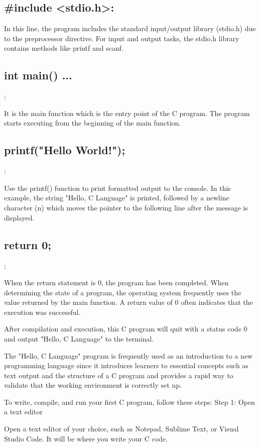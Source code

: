 \documentclass[11pt]{article}
\begin{document}
\subsection{\#include <stdio.h>:}

In this line, the program includes the standard input/output library (stdio.h) due to the preprocessor directive. For input and output tasks, the stdio.h library contains methods like printf and scanf.

\subsection{int main() { ... }}:

It is the main function which is the entry point of the C program. The program starts executing from the beginning of the main function.

\subsection{printf("Hello World!");}:

Use the printf() function to print formatted output to the console. In this example, the string "Hello, C Language" is printed, followed by a newline character (n) which moves the pointer to the following line after the message is displayed.

\subsection{return 0;};

When the return statement is 0, the program has been completed. When determining the state of a program, the operating system frequently uses the value returned by the main function. A return value of 0 often indicates that the execution was successful.

After compilation and execution, this C program will quit with a status code 0 and output "Hello, C Language" to the terminal.

The "Hello, C Language" program is frequently used as an introduction to a new programming language since it introduces learners to essential concepts such as text output and the structure of a C program and provides a rapid way to validate that the working environment is correctly set up.

To write, compile, and run your first C program, follow these steps:
Step 1: Open a text editor

Open a text editor of your choice, such as Notepad, Sublime Text, or Visual Studio Code. It will be where you write your C code.
\end{document}
